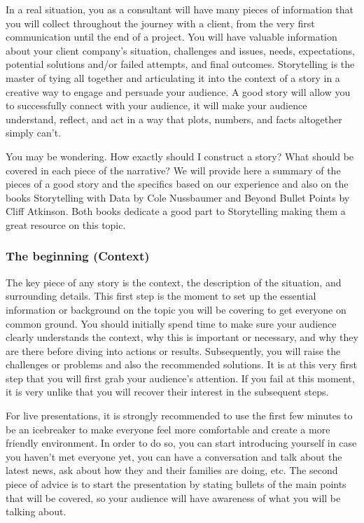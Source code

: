 \documentclass[
]{book}
\begin{document}
In a real situation, you as a consultant will have many pieces of information that you will collect throughout the journey with a client, from the very first communication until the end of a project. You will have valuable information about your client company's situation, challenges and issues, needs, expectations, potential solutions and/or failed attempts, and final outcomes. Storytelling is the master of tying all together and articulating it into the context of a story in a creative way to engage and persuade your audience. A good story will allow you to successfully connect with your audience, it will make your audience understand, reflect, and act in a way that plots, numbers, and facts altogether simply can't.

You may be wondering. How exactly should I construct a story? What should be covered in each piece of the narrative? We will provide here a summary of the pieces of a good story and the specifics based on our experience and also on the books Storytelling with Data by Cole Nussbaumer and Beyond Bullet Points by Cliff Atkinson. Both books dedicate a good part to Storytelling making them a great resource on this topic.

\hypertarget{the-beginning-context}{%
\subsubsection{The beginning (Context)}\label{the-beginning-context}}

The key piece of any story is the context, the description of the situation, and surrounding details. This first step is the moment to set up the essential information or background on the topic you will be covering to get everyone on common ground. You should initially spend time to make sure your audience clearly understands the context, why this is important or necessary, and why they are there before diving into actions or results. Subsequently, you will raise the challenges or problems and also the recommended solutions. It is at this very first step that you will first grab your audience's attention. If you fail at this moment, it is very unlike that you will recover their interest in the subsequent steps.

For live presentations, it is strongly recommended to use the first few minutes to be an icebreaker to make everyone feel more comfortable and create a more friendly environment. In order to do so, you can start introducing yourself in case you haven't met everyone yet, you can have a conversation and talk about the latest news, ask about how they and their families are doing, etc. The second piece of advice is to start the presentation by stating bullets of the main points that will be covered, so your audience will have awareness of what you will be talking about.
\end{document}
